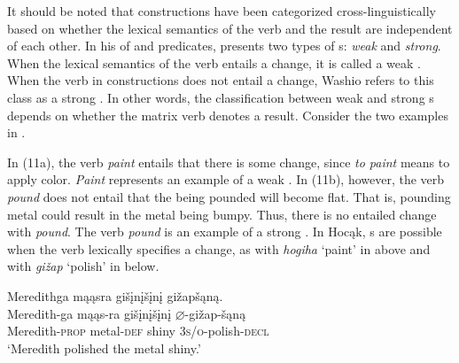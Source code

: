 \documentclass[output=paper]{LSP/langsci}
\begin{document}
It should be noted that  constructions have been categorized cross-linguistically based on whether the lexical semantics of the verb and the result are independent of each other. In his  of  and   predicates, \citet{Washio1997} presents two types of s: \textit{weak} and \textit{strong}. When the lexical semantics of the verb entails a change, it is called a weak . When the verb in  constructions does not entail a change, Washio refers to this class as a strong . In other words, the classification between weak and strong s depends on whether the matrix verb denotes a result. Consider the two  examples in .

\begin{exe}
\ex\label{ex:rosen:11}
\begin{xlist}



\end{xlist}
\end{exe}

In (11a), the verb \textit{paint} entails that there is some change, since \textit{to paint} means to apply color. \textit{Paint} represents an example of a weak . In (11b), however, the verb \textit{pound} does not entail that the  being pounded will become flat. That is, pounding metal could result in the metal being bumpy. Thus, there is no entailed change with \textit{pound}. The verb \textit{pound} is an example of a strong . In Hocąk, s are possible when the verb lexically specifies a change, as with \textit{hogiha} `paint' in  above and with \textit{gižap} `polish' in  below.

\begin{exe}
\ex\label{ex:rosen:12}
 \glll Meredithga mąąsra gišįnįšįnį gižapšąną.  \\
 Meredith-ga mąąs-ra gišįnįšįnį {$\varnothing$}-gižap-šąną\\
 Meredith-\textsc{prop} metal-\textsc{def} shiny \textsc{3s/o}-polish-\textsc{decl}\\
\glt `Meredith polished the metal shiny.'

\end{exe}
\end{document}
